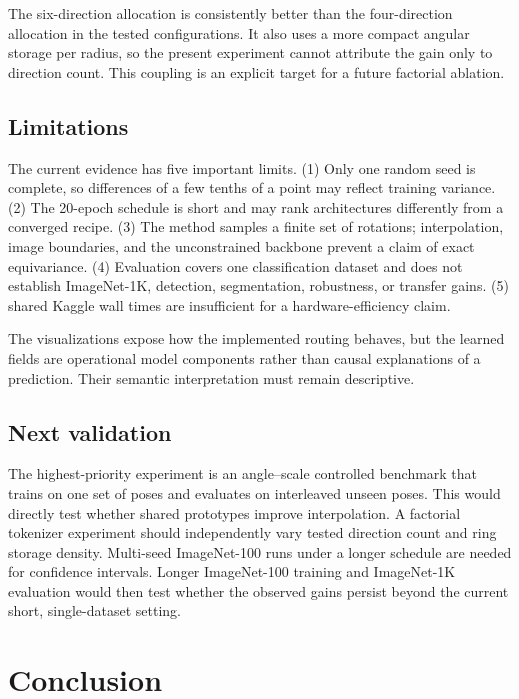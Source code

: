 \documentclass[10pt]{article}
\begin{document}
The six-direction allocation is consistently better than the four-direction
allocation in the tested configurations. It also uses a more compact angular
storage per radius, so the present experiment cannot attribute the gain only
to direction count. This coupling is an explicit target for a future factorial
ablation.

\subsection{Limitations}

The current evidence has five important limits. (1) Only one random seed is
complete, so differences of a few tenths of a point may reflect training
variance. (2) The 20-epoch schedule is short and may rank architectures
differently from a converged recipe. (3) The method samples a finite set of
rotations; interpolation, image boundaries, and the unconstrained backbone
prevent a claim of exact equivariance. (4) Evaluation covers one classification
dataset and does not establish ImageNet-1K, detection, segmentation,
robustness, or transfer gains. (5) shared Kaggle wall times are insufficient
for a hardware-efficiency claim.

The visualizations expose how the implemented routing behaves, but the learned
fields are operational model components rather than causal explanations of a
prediction. Their semantic interpretation must remain descriptive.

\subsection{Next validation}

The highest-priority experiment is an angle--scale controlled benchmark that
trains on one set of poses and evaluates on interleaved unseen poses. This would
directly test whether shared prototypes improve interpolation. A factorial
tokenizer experiment should independently vary tested direction count and ring
storage density. Multi-seed ImageNet-100 runs under a longer schedule are
needed for confidence intervals. Longer ImageNet-100 training and ImageNet-1K
evaluation would then test whether the observed gains persist beyond the
current short, single-dataset setting.

\section{Conclusion}
\end{document}
